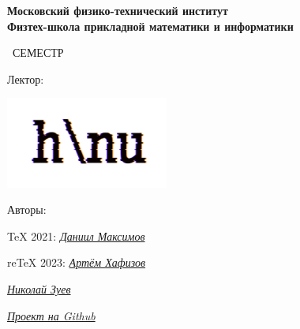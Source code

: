\begin{titlepage}
	\clearpage\thispagestyle{empty}
	\centering
	
	\textbf{Московский физико-технический институт \\ Физтех-школа прикладной математики и информатики}
	\vspace{33ex}
	
	{\textbf{\FullCourseNameFirstPart}}
	
	\SemesterNumber\ СЕМЕСТР  
	\vspace{1ex}
	
	Лектор: \textit{\LecturerInitials}
	
	\includegraphics[width=0.4\textwidth]{images/logo_ltc.png}

	\begin{flushright}
		\noindent
		

		Авторы:
		
		TeX 2021: \href{https://vk.com/wolfawi}{\textit{Даниил Максимов}}

		reTeX 2023: \href{https://vk.com/craftycraftz}{\textit{Артём Хафизов}}

					\href{https://vk.com/nickzu}{\textit{Николай Зуев}}
		
		\href{\GithubLink}{\textit{Проект на Github}}
	\end{flushright}
	
	\vfill
	\CourseDate
	\pagebreak
\end{titlepage}
